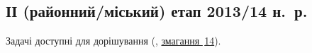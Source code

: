 \renewenvironment{problemAllDefault}[1]{\vspace{10mm}\par\begin{problem}{#1}{Клавіатура (stdin)}{Екран (stdout)}{1 сек}{64 мегабайти}}{\end{problem}}

\subsection{ІІ (районний/міський) етап 2013/14 н.~р.}

Задачі доступні для дорішування (\EjudgeCkipoName, \href{https://ejudge.ckipo.edu.ua/cgi-bin/new-register?contest_id=14}{змагання \textnumero$\,$14}).

	

	

	

	


